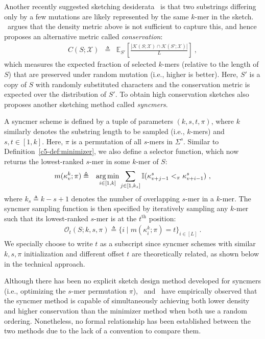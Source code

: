 \noindent Another recently suggested sketching desiderata~\citep{edgar2021syncmers} is that two substrings differing only by a few mutations are likely represented by the same $k$-mer in the sketch. \citet{edgar2021syncmers}~argues that the density metric above is not sufficient to capture this, and hence proposes an alternative metric called \textit{conservation}:
\begin{eqnarray}
{C}(S; \mathcal{X}) &\triangleq& \mathbb{E}_{S'}\left[\frac{\left|\mathcal{K}(S; \mathcal{X}) \cap \mathcal{K}(S'; \mathcal{X})\right|}{L}\right]\ ,
\label{c5-eq:cons}
\end{eqnarray} 
which measures the expected fraction of selected $k$-mers (relative to the length of $S$) that are preserved under random mutation (i.e., higher is better). Here, $S'$ is a copy of $S$ with randomly substituted characters and the conservation metric is expected over the distribution of $S'$. To obtain high conservation sketches \citet{edgar2021syncmers} also proposes another sketching method called \emph{syncmers}.
\begin{definition}[Syncmer]
\label{c5-def:syncmer}
A syncmer scheme is defined by a tuple of parameters $(k, s, t, \pi)$, where $k$ similarly denotes the substring length to be sampled (i.e., $k$-mers) and $s, t \in [1,k]$. Here, $\pi$ is a permutation of all $s$-mers in $\Sigma^s$. Similar to Definition~\ref{c5-def:minimizer}, we also define a selector function, which now returns the lowest-ranked $s$-mer in some $k$-mer of $S$: 
\begin{eqnarray}
m(\kappa^k_v; \pi) &\triangleq& \underset{i \in [1,k]}{\operatorname{\arg\min}} \sum_{j\in[1,k_s]} \mathbb{I}(\kappa^s_{v+j-1} <_{\pi} \kappa^s_{v+i-1}) \ ,
\end{eqnarray}
where $k_s \triangleq k-s+1$ denotes the number of overlapping $s$-mer in a $k$-mer. The syncmer sampling function is then specified by iteratively sampling any $k$-mer such that its lowest-ranked $s$-mer is at the $t^{\text{th}}$ position:
\begin{eqnarray}
\mathcal{O}_t(S; k, s, \pi) \triangleq \{i \mid m(\kappa^k_i; \pi) = t\}_{i\in [L]} \ .
\end{eqnarray}
We specially choose to write $t$ as a subscript since syncmer schemes with similar $k, s, \pi$ initialization and different offset $t$ are theoretically related, as shown below in the technical approach.
\end{definition}
Although there has been no explicit sketch design method developed for syncmers (i.e., optimizing the $s$-mer permutation $\pi$), \citet{edgar2021syncmers}~and \citet{shaw2021theory}~have empirically observed that the syncmer method is capable of simultaneously achieving both lower density and higher conservation than the minimizer method when both use a random ordering. Nonetheless, no formal relationship has been established between the two methods due to the lack of a convention to compare them.

